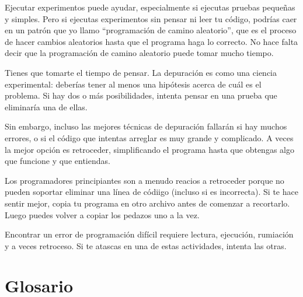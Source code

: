 \documentclass[10pt]{book}
\begin{document}
Ejecutar experimentos puede ayudar, especialmente si ejecutas pruebas
pequeñas y simples.  Pero si ejecutas experimentos sin pensar ni leer tu
código, podrías caer en un patrón que yo llamo ``programación de camino aleatorio'',
que es el proceso de hacer cambios aleatorios hasta que el programa
haga lo correcto.  No hace falta decir que la programación de camino aleatorio
puede tomar mucho tiempo.

Tienes que tomarte el tiempo de pensar.  La depuración es como una
ciencia experimental: deberías tener al menos una hipótesis acerca de
cuál es el problema.  Si hay dos o más posibilidades, intenta
pensar en una prueba que eliminaría una de ellas.

Sin embargo, incluso las mejores técnicas de depuración fallarán si hay muchos
errores, o si el código que intentas arreglar es muy grande y
complicado.  A veces la mejor opción es retroceder, simplificando el
programa hasta que obtengas algo que funcione y que
entiendas.

Los programadores principiantes son a menudo reacios a retroceder porque
no pueden soportar eliminar una línea de códiigo (incluso si es incorrecta).
Si te hace sentir mejor, copia tu programa en otro archivo
antes de comenzar a recortarlo.  Luego puedes volver a copiar los
pedazos uno a la vez.

Encontrar un error de programación difícil requiere lectura, ejecución, rumiación y
a veces retroceso.  Si te atascas en una de estas actividades,
intenta las otras.


\section{Glosario}
\end{document}
